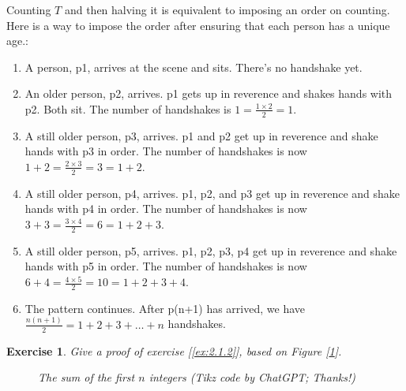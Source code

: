 \documentclass[11pt]{book}
\theoremstyle{definition}
\theoremstyle{plain}
\newtheorem{exercise}{Exercise}
\theoremstyle{definition}
\theoremstyle{problemstyle}
\theoremstyle{remark}
\theoremstyle{definition}
\begin{document}
Counting $T$ and then halving it is equivalent to imposing an order on counting. Here is a way to impose the order after ensuring that each person has a unique age.:
\begin{enumerate}
    \item A person, p1, arrives at the scene and sits. There's no handshake yet.
    \item An older person, p2, arrives. p1 gets up in reverence and shakes hands with p2. Both sit. The number of handshakes is $1=\frac{1\times2}{2}=1$.
    \item A still older person, p3, arrives. p1 and p2 get up in reverence and shake hands with p3 in order. The number of handshakes is now $1+2=\frac{2\times3}{2}=3=1+2$.
    \item A still older person, p4, arrives. p1, p2, and p3 get up in reverence and shake hands with p4 in order. The number of handshakes is now $3+3=\frac{3\times4}{2}=6=1+2+3$.
    \item A still older person, p5, arrives. p1, p2, p3, p4 get up in reverence and shake hands with p5 in order. The number of handshakes is now $6+4=\frac{4\times5}{2}=10=1+2+3+4$.
    \item The pattern continues. After p(n+1) has arrived, we have $\frac{n(n+1)}{2}=1+2+3+\dots+n$ handshakes.
\end{enumerate}
\begin{exercise}
    \label{ex:2.1.4}
    Give a proof of exercise [\ref{ex:2.1.2}], based on Figure [\ref{fig:sum-of-n}].
    \begin{figure}[H]
    \centering
        \caption{The sum of the first $n$ integers (Tikz code by ChatGPT; Thanks!)}
  \label{fig:sum-of-n}
\end{figure}
\end{exercise}
\end{document}
